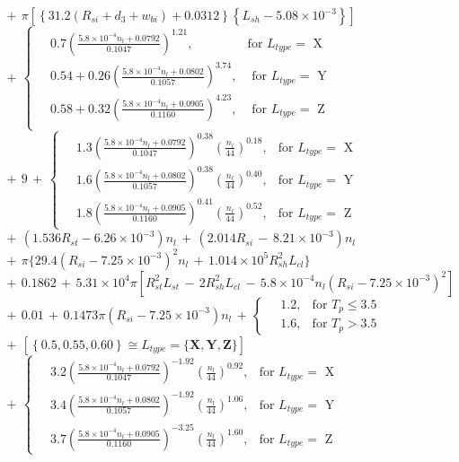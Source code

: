 \begin{singlespacing}
\begin{flushleft}
$
\, + \, \pi \left[ \left\{ 31.2( R_{si} + d_{3} + w_{bi}) + 0.0312 \right\} \left\{ L_{sh} - 5.08 \times 10^{-3} \right\} \right]
$\\
$
\, + \, 
\begin{cases}
\quad 0.7(\frac{5.8 \times 10^{-4} n_{l} + 0.0792}{0.1047})^{1.21},  & \text{for $L_{type} = $ X} \\
\quad 0.54 + 0.26( \frac{5.8 \times 10^{-4} n_{l} + 0.0802}{0.1057})^{3.74}, & \text{ for $L_{type} =$ Y} \\
\quad 0.58 + 0.32( \frac{5.8 \times 10^{-4} n_{l} + 0.0905}{0.1160})^{4.23}, & \text{ for $L_{type} =$ Z} \\
\end{cases}
$\\
$ \, + \, 9 \, + \, \begin{cases}
\quad 1.3(\frac{5.8 \times 10^{-4} n_{l} + 0.0792}{0.1047})^{0.38} (\frac{n_{l}}{44})^{0.18}, & \text{for $L_{type} =$ X} \\
\quad 1.6(\frac{5.8 \times 10^{-4} n_{l} + 0.0802}{0.1057})^{0.38} (\frac{n_{l}}{44})^{0.40}, & \text{for $L_{type} =$ Y} \\
\quad 1.8(\frac{5.8 \times 10^{-4} n_{l} + 0.0905}{0.1160})^{0.41} (\frac{n_{l}}{44})^{0.52}, & \text{for $L_{type} =$ Z}
\end{cases}
$\\
$
\, + \, (1.536 R_{st} - 6.26 \times 10^{-3}) n_{l} \, + \, (2.014 R_{si} \, - \, 8.21 \times 10^{-3}) n_{l}
$\\
$
\, + \, \pi \{29.4(R_{si} - 7.25 \times 10^{-3})^{2} n_{l} \, + \, 1.014 \times 10^{5} R_{sh}^{2} L_{cl}\} 
$\\
$
\, + \, 0.1862 \, + \, 5.31 \times 10^{4} \pi [ R_{st}^{2} L_{st} \, - \,  2 R_{sh}^{2} L_{cl} 
\, - \, 5.8 \times 10^{-4} n_{l}(R_{si} - 7.25 \times 10^{-3})^{2}] 
$\\
$
 \, + \, 0.01 \, + \,0.1473 \pi (R_{si} - 7.25 \times 10^{-3}) n_{l} \, + \, \begin{cases}
\quad 1.2, & \text{for $T_{p} \le 3.5$} \\
\quad 1.6, & \text{for $T_{p} > 3.5$} 
\end{cases}
$\\
$
\, + \, \left[ \left\{ 0.5, 0.55, 0.60 \right\} \cong L_{type} = \{ \textbf{X}, \textbf{Y}, \textbf{Z} \} \right]
$\\
$
\, + \, \begin{cases}
\quad 3.2(\frac{5.8 \times 10^{-4} n_{l} + 0.0792}{0.1047})^{-1.92}(\frac{n_{l}}{44})^{0.92}, & \text{for $L_{type} = $ X} \\ 
\quad 3.4(\frac{5.8 \times 10^{-4} n_{l} + 0.0802}{0.1057})^{-1.92}(\frac{n_{l}}{44})^{1.06}, & \text{for $L_{type} = $ Y} \\ 
\quad 3.7(\frac{5.8 \times 10^{-4} n_{l} + 0.0905}{0.1160})^{-3.25}(\frac{n_{l}}{44})^{1.60}, & \text{for $L_{type} = $ Z} 
\end{cases}
$
\\[\baselineskip]


\end{flushleft}
\end{singlespacing}
